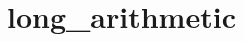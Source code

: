 \chapter{long\+\_\+arithmetic }
\hypertarget{md__r_e_a_d_m_e}{}\label{md__r_e_a_d_m_e}
\label{md__r_e_a_d_m_e_autotoc_md0}%
%
